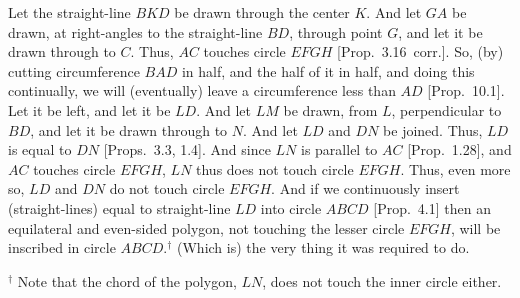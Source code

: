 \begin{Parallel}{}{}
{Let the straight-line $BKD$ be drawn through the center $K$. And let $GA$ be drawn, at right-angles to the
straight-line $BD$, through point $G$, and let it be drawn through to $C$. Thus, $AC$ touches  circle $EFGH$ [Prop.~3.16~corr.]. 
So, (by) cutting circumference $BAD$ in half, and the half of it in half, and 
doing this continually, we will (eventually) leave
a circumference less than $AD$ [Prop.~10.1]. Let it be left, and let it be $LD$. And let $LM$ be drawn, from $L$, 
perpendicular to $BD$, and let it be drawn through to $N$. And let $LD$ and $DN$ be joined. 
Thus, $LD$ is equal to $DN$ [Props.~3.3, 1.4]. 
And since $LN$ is
parallel to $AC$ [Prop.~1.28], and $AC$ touches circle $EFGH$, $LN$ thus does not touch circle $EFGH$. Thus,
even more so, $LD$ and $DN$ do not touch circle $EFGH$. And if we continuously insert (straight-lines) equal to straight-line
$LD$ into circle $ABCD$ [Prop.~4.1] then an equilateral and even-sided polygon, not touching
the lesser circle $EFGH$, will be inscribed in circle $ABCD$.$^\dag$ (Which is) the very thing it was required to do.}
\end{Parallel}
{\footnotesize\noindent$^\dag$ Note that the chord of the polygon, $LN$, does not touch the inner circle either.}

